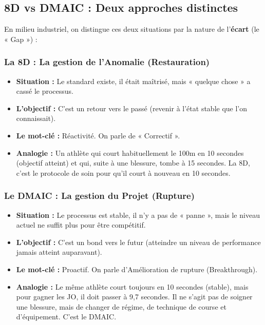 \documentclass[11pt,a4paper]{article}
\begin{document}
\newpage
\subsection{8D vs DMAIC : Deux approches distinctes}

En milieu industriel, on distingue ces deux situations par la nature de l'\textbf{écart} (le « Gap ») :

\subsubsection{La 8D : La gestion de l'Anomalie (Restauration)}

\begin{itemize}[leftmargin=*,itemsep=0.3em]
  \item \textbf{Situation :} Le standard existe, il était maîtrisé, mais « quelque chose » a cassé le processus.
  \item \textbf{L'objectif :} C'est un retour vers le passé (revenir à l'état stable que l'on connaissait).
  \item \textbf{Le mot-clé :} Réactivité. On parle de « Correctif ».
  \item \textbf{Analogie :} Un athlète qui court habituellement le 100m en 10 secondes (objectif atteint) et qui, suite à une blessure, tombe à 15 secondes. La 8D, c'est le protocole de soin pour qu'il court à nouveau en 10 secondes.
\end{itemize}

\subsubsection{Le DMAIC : La gestion du Projet (Rupture)}

\begin{itemize}[leftmargin=*,itemsep=0.3em]
  \item \textbf{Situation :} Le processus est stable, il n'y a pas de « panne », mais le niveau actuel ne suffit plus pour être compétitif.
  \item \textbf{L'objectif :} C'est un bond vers le futur (atteindre un niveau de performance jamais atteint auparavant).
  \item \textbf{Le mot-clé :} Proactif. On parle d'Amélioration de rupture (Breakthrough).
  \item \textbf{Analogie :} Le même athlète court toujours en 10 secondes (stable), mais pour gagner les JO, il doit passer à 9,7 secondes. Il ne s'agit pas de soigner une blessure, mais de changer de régime, de technique de course et d'équipement. C'est le DMAIC.
\end{itemize}
\end{document}
